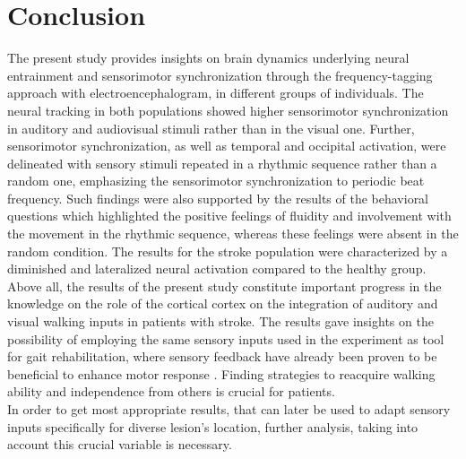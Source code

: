 \chapter{Conclusion}
The present study provides insights on brain dynamics underlying neural entrainment and sensorimotor synchronization through the frequency-tagging approach with electroencephalogram, in different groups of individuals. The neural tracking in both populations showed higher sensorimotor synchronization in auditory and audiovisual stimuli rather than in the visual one. Further, sensorimotor synchronization, as well as temporal and occipital activation, were delineated with sensory stimuli repeated in a rhythmic sequence rather than a random one, emphasizing the sensorimotor synchronization to periodic beat frequency. Such findings were also supported by the results of the behavioral questions which highlighted the positive feelings of fluidity and involvement with the movement in the rhythmic sequence, whereas these feelings were absent in the random condition. The results for the stroke population were characterized by a diminished and lateralized neural activation compared to the healthy group. \\
Above all, the results of the present study constitute important progress in the knowledge on the role of the cortical cortex on the integration of auditory and visual walking inputs in patients with stroke. The results gave insights on the possibility of employing the same sensory inputs used in the experiment as tool for gait rehabilitation, where sensory feedback have already been proven to be beneficial to enhance motor response \parencite{Bolognini_2016}. Finding strategies to reacquire walking ability and independence from others is crucial for patients. \\
In order to get most appropriate results, that can later be used to adapt sensory inputs specifically for diverse lesion's location, further analysis, taking into account this crucial variable is necessary.


